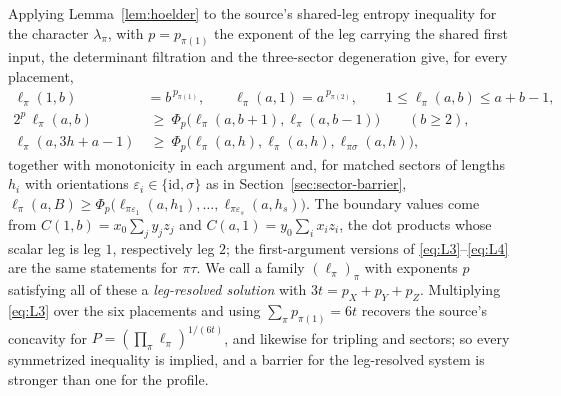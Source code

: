 \documentclass[11pt]{article}
\begin{document}
Applying Lemma~\ref{lem:hoelder} to the source's shared-leg entropy
inequality for the character $\lambda_\pi$, with $p=p_{\pi(1)}$ the
exponent of the leg carrying the shared first input, the determinant
filtration and the three-sector degeneration give, for every placement,
\begin{align}
 \ell_\pi(1,b)&=b^{\,p_{\pi(1)}},\qquad
 \ell_\pi(a,1)=a^{\,p_{\pi(2)}},\qquad
 1\le\ell_\pi(a,b)\le a+b-1,\label{eq:L1}\\
 2^{p}\,\ell_\pi(a,b)&\ \ge\ \Phi_p\bigl(\ell_\pi(a,b+1),\ell_\pi(a,b-1)\bigr)
 \qquad(b\ge2),\label{eq:L3}\\
 \ell_\pi(a,3h+a-1)&\ \ge\ \Phi_p\bigl(\ell_\pi(a,h),\ell_\pi(a,h),
 \ell_{\pi\sigma}(a,h)\bigr),\label{eq:L4}
\end{align}
together with monotonicity in each argument and, for matched sectors
of lengths $h_i$ with orientations $\varepsilon_i\in\{\mathrm{id},\sigma\}$
as in Section~\ref{sec:sector-barrier},
$\ell_\pi(a,B)\ge\Phi_p\bigl(\ell_{\pi\varepsilon_1}(a,h_1),\dots,
\ell_{\pi\varepsilon_s}(a,h_s)\bigr)$. The boundary values come from
$C(1,b)=x_0\sum_jy_jz_j$ and $C(a,1)=y_0\sum_ix_iz_i$, the dot products
whose scalar leg is leg $1$, respectively leg $2$; the first-argument
versions of
\eqref{eq:L3}--\eqref{eq:L4} are the same statements for $\pi\tau$.
We call a family $(\ell_\pi)_\pi$ with exponents $p$ satisfying all
of these a \emph{leg-resolved solution} with $3t=p_X+p_Y+p_Z$.
Multiplying \eqref{eq:L3} over the six placements and using
$\sum_\pi p_{\pi(1)}=6t$ recovers the source's concavity for
$P=(\prod_\pi\ell_\pi)^{1/(6t)}$, and likewise for tripling and
sectors; so every symmetrized inequality is implied, and a barrier for
the leg-resolved system is stronger than one for the profile.
\end{document}
